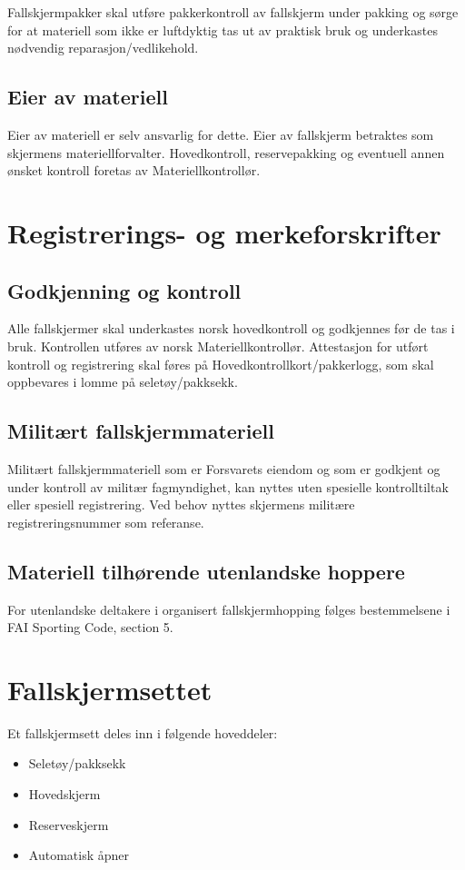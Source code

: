 Fallskjermpakker skal utføre pakkerkontroll av fallskjerm under pakking og sørge for at materiell som ikke er luftdyktig tas ut av praktisk bruk og underkastes nødvendig reparasjon/vedlikehold.

\subsection{Eier av materiell}
Eier av materiell er selv ansvarlig for dette. Eier av fallskjerm betraktes som skjermens materiellforvalter. Hovedkontroll, reservepakking og eventuell annen ønsket kontroll foretas av Materiellkontrollør.

\section{Registrerings- og merkeforskrifter}
\subsection{Godkjenning og kontroll}
Alle fallskjermer skal underkastes norsk hovedkontroll og godkjennes før de tas i bruk. Kontrollen utføres av norsk Materiellkontrollør. Attestasjon for utført kontroll og registrering skal føres på Hovedkontrollkort/pakkerlogg, som skal oppbevares i lomme på seletøy/pakksekk.

\subsection{Militært fallskjermmateriell}
Militært fallskjermmateriell som er Forsvarets eiendom og som er godkjent og under kontroll av militær fagmyndighet, kan nyttes uten spesielle kontrolltiltak eller spesiell registrering. Ved behov nyttes skjermens militære registreringsnummer som referanse.

\subsection{Materiell tilhørende utenlandske hoppere}
For utenlandske deltakere i organisert fallskjermhopping følges bestemmelsene i FAI Sporting Code, section 5.

\section{Fallskjermsettet}
Et fallskjermsett deles inn i følgende hoveddeler:
\begin{itemize}
	\item Seletøy/pakksekk
	\item Hovedskjerm
	\item Reserveskjerm
	\item Automatisk åpner
\end{itemize}

